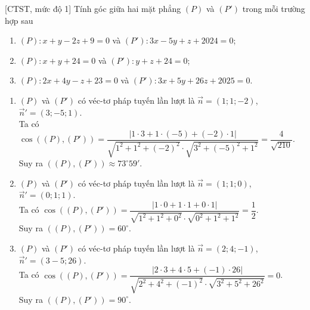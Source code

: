 \begin{bt}%
[CTST, mức độ 1]%
	Tính góc giữa hai mặt phẳng $(P)$ và $(P')$ trong mỗi trường hợp sau
	\begin{enumerate}
		\item $(P)\colon x+y-2z+9=0$ và $(P')\colon 3x-5y+z+2024=0$;
		\item $(P)\colon x+y+24=0$ và $(P')\colon y+z+24=0$;
		\item $(P)\colon 2x+4y-z+23=0$ và $(P')\colon 3x+5y+26z+2025=0$.
	\end{enumerate}
	\loigiai
	{
		\begin{enumerate}
			\item $(P)$ và $(P')$ có véc-tơ pháp tuyến lần lượt là $\overrightarrow{n}=(1;1;-2)$, $\overrightarrow{n}'=(3;-5;1)$.\\
			Ta có $\cos\left ((P),(P') \right )=\dfrac{\left |1\cdot 3+1\cdot (-5)+(-2)\cdot 1 \right |}{\sqrt{1^2+1^2+(-2)^2}\cdot\sqrt{3^2+(-5)^2+1^2}}=\dfrac{4}{\sqrt{210}}$.\\
			Suy ra $((P),(P'))\approx 73^{\circ}59'$.
			\item $(P)$ và $(P')$ có véc-tơ pháp tuyến lần lượt là $\overrightarrow{n}=(1;1;0)$, $\overrightarrow{n}'=(0;1;1)$.\\
			Ta có $\cos\left ((P),(P') \right )=\dfrac{\left |1\cdot 0+1\cdot 1+0\cdot 1 \right |}{\sqrt{1^2+1^2+0^2}\cdot\sqrt{0^2+1^2+1^2}}=\dfrac{1}{2}$.\\
			Suy ra $((P),(P'))=60^{\circ}$.
			\item $(P)$ và $(P')$ có véc-tơ pháp tuyến lần lượt là $\overrightarrow{n}=(2;4;-1)$, $\overrightarrow{n}'=(3-5;26)$.\\
			Ta có $\cos\left ((P),(P') \right )=\dfrac{\left |2\cdot 3+4\cdot 5+(-1)\cdot 26 \right |}{\sqrt{2^2+4^2+(-1)^2}\cdot\sqrt{3^2+5^2+26^2}}=0$.\\
			Suy ra $((P),(P'))=90^{\circ}$.
		\end{enumerate}
	}
\end{bt}

